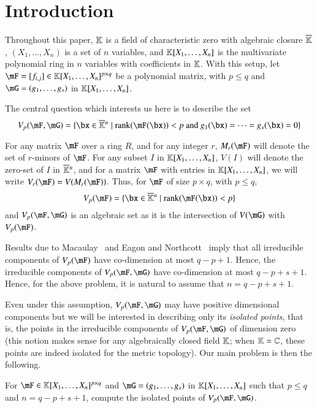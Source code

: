 \section{Introduction}\label{sec:intro}
Throughout this paper, $\mathbb{K}$ is a field of characteristic zero with algebraic closure
$\overline{\mathbb{K}}$, $(X_1, \ldots, X_n)$ is a set of $n$ variables, and
$\mathbb{K}[X_1,\dots,X_n]$ is the multivariate polynomial ring in $n$ variables with
coefficients in $\mathbb{K}$. With this setup, let $\mF=[f_{i,j}] \in
\KK[X_1,\dots,X_n]^{p \times q}$ be a polynomial matrix, with $p \leq q$ and
$\mG = (g_1, \ldots, g_s)$ in $\mathbb{K}[X_1, \ldots, X_n]$.

The central question which interests us here is to describe the set
$$\VpFG{p}{\mF}{\mG} = \{\bx \in \KKbar{}^n \mid
\mathrm{rank}(\mF({\bx})) < p \text{~and~} g_1(\bx)=\cdots=g_s(\bx)=0
\}$$

For any matrix $\mF$ over a ring $R$, and for any integer $r$,
$M_r(\mF)$ will denote the set of $r$-minors of $\mF$. For any subset $I$ in
$\mathbb{K}[X_1,\dots,X_n]$, $V(I)$ will denote the zero-set of $I$ in
$\overline{\mathbb{K}}{}^n$, and for a matrix $\mF$ with entries in
$\mathbb{K}[X_1,\dots,X_n]$, we will write $V_r(\mF)=V(M_r(\mF))$. Thus, for
$\mF$ of size $p \times q$, with $p \le q$, 
$$\VpF{p}{\mF}=\{\bx \in \KKbar{}^n \mid \mathrm{rank}(\mF({\bx})) < p\}$$
and $\VpFG{p}{\mF}{\mG}$ is an algebraic set as it is the intersection of
$V(\mG)$ with $\VpF{p}{\mF}$.

Results due to Macaulay~\cite{Macaulay16} and Eagon and Northcott~\cite{EN62}
imply that all irreducible components of $\VpF{p}{\mF}$ have co-dimension at
most $q-p+1$. Hence, the irreducible components of $\VpFG{p}{\mF}{\mG}$ have
co-dimension at most $q-p+s+1$. Hence, for the above problem, it is natural to
assume that $n = q-p+s+1$.

Even under this assumption, $\VpFG{p}{\mF}{\mG}$ may have positive dimensional
components but we will be interested in describing only its {\em isolated
  points}, that is, the points in the irreducible components of
$\VpFG{p}{\mF}{\mG}$ of dimension zero (this notion makes sense for any
algebraically closed field $\mathbb{K}$; when $\mathbb{K}=\mathbb{C}$, these points are indeed
isolated for the metric topology).
Our main problem is then the following.
\begin{pbm} \label{problem2} For $\mF \in \KK[X_1,\dots,X_n]^{p \times q}$ and
  $\mG=(g_1,\dots,g_s)$ in $\mathbb{K}[X_1,\dots,X_n]$ such that $p \leq q$ and $n =
  q-p+s+1$, compute the isolated points of $\VpFG{p}{\mF}{\mG}$.
\end{pbm}

